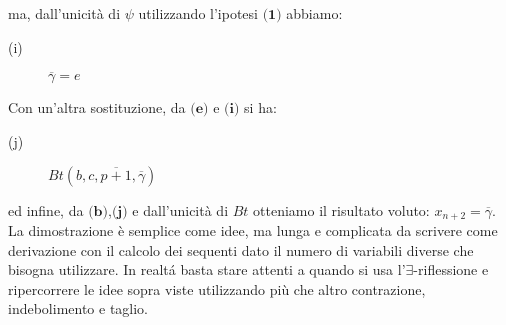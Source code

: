 \begin{itemize}
\begin{enumerate}
\begin{description}
        \end{description}
        ma, dall'unicit\`a di $\psi$ utilizzando l'ipotesi $\textbf{(1)}$ abbiamo: \\
        \begin{description}
          \item [(i)] $\overline{\gamma}=e$ \\
        \end{description}
        Con un'altra sostituzione, da $\textbf{(e)}$ e $\textbf{(i)}$ si ha: \\
        \begin{description}
          \item [(j)] $Bt(b,c,\overline{p+1},\overline{\gamma})$ \\
        \end{description}
        ed infine, da $\textbf{(b)}$,$\textbf{(j)}$ e dall'unicit\`a di $Bt$ otteniamo il risultato voluto: $x_{n+2}=\overline{\gamma}$. \\
        La dimostrazione \`e semplice come idee, ma lunga e complicata da scrivere come derivazione con il calcolo dei sequenti dato il numero di variabili diverse che bisogna utilizzare. In realt\'a basta stare attenti a quando si usa l'$\exists$-riflessione e ripercorrere le idee sopra viste utilizzando pi\`u che altro contrazione, indebolimento e taglio. \\
  \end{enumerate}


\end{itemize}
